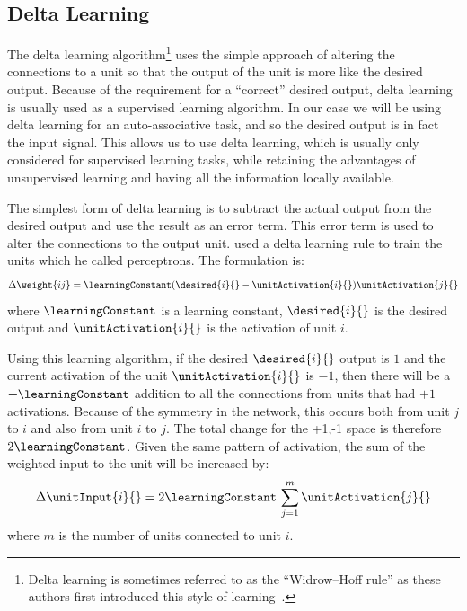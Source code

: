 \subsection{Delta Learning}
\label{sec:deltaLearning}

The delta learning algorithm\footnote{Delta learning is sometimes referred to as the ``Widrow--Hoff rule'' as these authors first introduced this style of learning~\citep{Widrow1960}.} uses the simple approach of altering the connections to a unit so that the output of the unit is more like the desired output.  Because of the requirement for a ``correct'' desired output, delta learning is usually used as a supervised learning algorithm.  In our case we will be using delta learning for an auto-associative task, and so the desired output is in fact the input signal.  This allows us to use delta learning, which is usually only considered for supervised learning tasks, while retaining the advantages of unsupervised learning and having all the information locally available.

The simplest form of delta learning is to subtract the actual output from the desired output and use the result as an error term.  This error term is used to alter the connections to the output unit.  \citet{Rosenblatt1958} used a delta learning rule to train the units which he called perceptrons. The formulation is:
\begin{equation}
	\Delta\weight{ij} = \learningConstant(\desired{i}{} - \unitActivation{i}{})\unitActivation{j}{}
\end{equation}
where $\learningConstant$ is a learning constant, $\desired{i}{}$ is the desired output and $\unitActivation{i}{}$ is the activation of unit $i$.

Using this learning algorithm, if the desired $\desired{i}{}$ output is $1$ and the current activation of the unit $\unitActivation{i}{}$ is $-1$, then there will be a $+\learningConstant$ addition to all the connections from units that had $+1$ activations.  Because of the symmetry in the network, this occurs both from unit $j$ to $i$ and also from unit $i$ to $j$.  The total change for the +1,-1 space is therefore $2\learningConstant$.  Given the same pattern of activation, the sum of the weighted input to the unit will be increased by:
\begin{equation}
	\Delta\unitInput{i}{}=2\learningConstant\,\sum_{j=1}^{m}\unitActivation{j}{}
\end{equation} 
where $m$ is the number of units connected to unit $i$.

